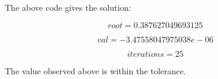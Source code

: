 \documentclass[a4paper]{article}
\begin{document}
The above code gives the solution:

\begin{equation}
root = 0.387627049693125
\end{equation}


\begin{equation}
val = -3.47558047975038e-06
\end{equation}

\begin{equation}
iterations = 25
\end{equation}

The value observed above is within the tolerance. 
\end{document}
